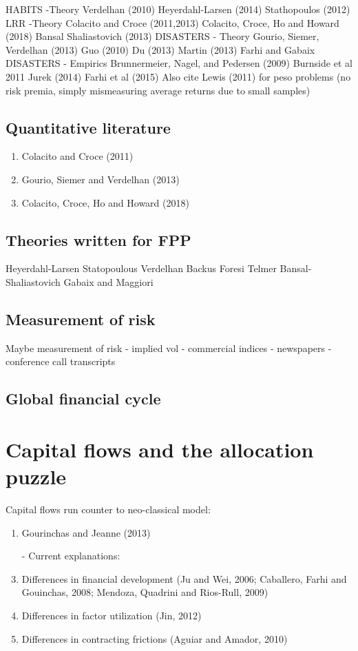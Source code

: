 \documentclass{ar-1col}
\begin{document}
HABITS -Theory
Verdelhan (2010)
Heyerdahl-Larsen (2014)
Stathopoulos (2012)
LRR -Theory
Colacito and Croce (2011,2013)
Colacito, Croce, Ho and Howard (2018)
Bansal Shaliastovich (2013)
DISASTERS - Theory
Gourio, Siemer, Verdelhan (2013)
Guo (2010)
Du (2013)
Martin (2013)
Farhi and Gabaix
DISASTERS - Empirics
Brunnermeier, Nagel, and Pedersen (2009)
Burnside et al 2011
Jurek (2014)
Farhi et al (2015)
Also cite Lewis (2011) for peso problems (no risk premia, simply mismeasuring average returns due to small samples)

\subsection{Quantitative literature}
\begin{enumerate}
\item Colacito and Croce (2011)
\item Gourio, Siemer and Verdelhan (2013)
\item Colacito, Croce, Ho and Howard (2018)
\end{enumerate}
\subsection{Theories written for FPP}
Heyerdahl-Larsen Statopoulous Verdelhan Backus Foresi Telmer 
Bansal-Shaliastovich
Gabaix and Maggiori
\subsection{Measurement of risk}
Maybe measurement of risk - implied vol - commercial indices -
newspapers - conference call transcripts
\subsection{Global financial cycle}

\section{Capital flows and the allocation puzzle}
Capital flows run counter to neo-classical model:
\begin{enumerate}
\item Gourinchas and Jeanne (2013)
\item[-] Current explanations:
\item Differences in financial development (Ju and Wei, 2006;
  Caballero, Farhi and Gouinchas, 2008; Mendoza, Quadrini and
  Rios-Rull, 2009)
\item Differences in factor utilization (Jin, 2012)
\item Differences in contracting frictions (Aguiar and Amador, 2010)
\end{enumerate}
\end{document}

